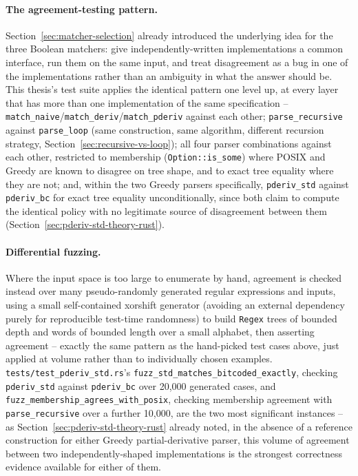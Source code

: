 \paragraph{The agreement-testing pattern.} Section~\ref{sec:matcher-selection}
already introduced the underlying idea for the three Boolean matchers:
give independently-written implementations a common interface, run them
on the same input, and treat disagreement as a bug in one of the
implementations rather than an ambiguity in what the answer should be.
This thesis's test suite applies the identical pattern one level up, at
every layer that has more than one implementation of the same
specification -- \texttt{match\_naive}/\texttt{match\_deriv}/\texttt{match\_pderiv}
against each other; \texttt{parse\_recursive} against \texttt{parse\_loop}
(same construction, same algorithm, different recursion strategy,
Section~\ref{sec:recursive-vs-loop}); all four parser combinations
against each other, restricted to membership (\texttt{Option::is\_some})
where POSIX and Greedy are known to disagree on tree shape, and to exact
tree equality where they are not; and, within the two Greedy parsers
specifically, \texttt{pderiv\_std} against \texttt{pderiv\_bc} for exact
tree equality unconditionally, since both claim to compute the
identical policy with no legitimate source of disagreement between them
(Section~\ref{sec:pderiv-std-theory-rust}).

\paragraph{Differential fuzzing.} Where the input space is too large to
enumerate by hand, agreement is checked instead over many
pseudo-randomly generated regular expressions and inputs, using a small
self-contained xorshift generator (avoiding an external
dependency purely for reproducible test-time randomness) to build
\texttt{Regex} trees of bounded depth and words of bounded length over a
small alphabet, then asserting agreement -- exactly the same pattern as
the hand-picked test cases above, just applied at volume rather than to
individually chosen examples. \texttt{tests/test\_pderiv\_std.rs}'s
\texttt{fuzz\_std\_matches\_bitcoded\_exactly}, checking
\texttt{pderiv\_std} against \texttt{pderiv\_bc} over 20{,}000 generated
cases, and \texttt{fuzz\_membership\_agrees\_with\_posix}, checking
membership agreement with \texttt{parse\_recursive} over a further
10{,}000, are the two most significant instances -- as
Section~\ref{sec:pderiv-std-theory-rust} already noted, in the absence
of a reference construction for either Greedy partial-derivative parser,
this volume of agreement between two independently-shaped
implementations is the strongest correctness evidence available for
either of them.



